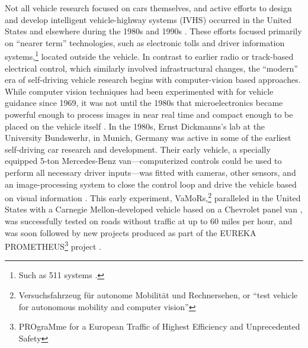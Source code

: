 
Not all vehicle research focused on cars themselves, and active
efforts to design and develop intelligent vehicle-highway systems (IVHS) occurred
in the United States and elsewhere during the 1980s and 1990s \cite[p.
  11-12]{wetmore}. These
efforts focused primarily on ``nearer term'' technologies, such as
electronic tolls and driver information systems,\footnote{Such as 511
  systems \cite{costello511}.} located
outside the vehicle. In contrast to earlier radio or track-based
electrical control, which similarly involved infrastructural changes, the 
``modern'' era of self-driving vehicle research begins with
computer-vision based approaches. While computer vision techniques had
been experimented with for vehicle guidance since 1969, it was not
until the 1980s that microelectronics became powerful enough to
process images in near real time and compact enough to be placed on
the vehicle itself \cite[p. v]{dickmannsDynamic} \cite{vamors-p}. In the 1980s, Ernst
Dickmanns's lab at the 
University Bundswerhr, in Munich, Germany was active in some of the
earliest self-driving car research and development. Their early
vehicle, a specially equipped 5-ton Mercedes-Benz van---computerized
controls could be used to perform all necessary driver inputs---was
fitted with cameras, other sensors, and an image-processing system to
close the control loop and drive the vehicle based on visual
information \cite{vamors-p}. This early experiment,
VaMoRs,\footnote{Versuchsfahrzeug f\"{u}r autonome Mobilit\"{a}t und
  Rechnersehen, or ``test vehicle for autonomous mobility and computer
  vision''} paralleled in the United  
States with a Carnegie Mellon-developed vehicle based on a Chevrolet
panel van \cite{bogostHist}, was successfully tested on roads without
traffic at up to 
60 miles per hour, and was soon followed by new projects produced as
part of the EUREKA PROMETHEUS\footnote{PROgraMme for a European
  Traffic of Highest Efficiency and Unprecedented Safety} project
\cite{eureka}. 

